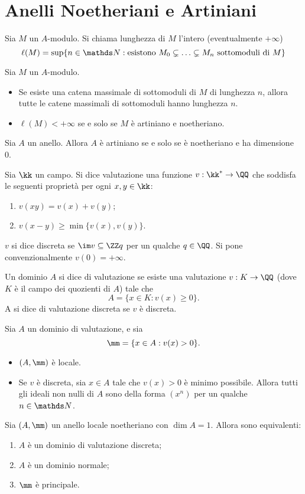 \section{Anelli Noetheriani e Artiniani}

\begin{definition}
Sia $M$ un $A$-modulo. Si chiama lunghezza di $M$ l'intero (eventualmente $+\infty$)
$$
\ell(M)=\sup\{n\in\NN:\text{esistono $M_0\subsn\ldots\subsn M_n$ sottomoduli di $M$}\}
$$
\end{definition}
\begin{lemma}
Sia $M$ un $A$-modulo.
\begin{itemize}
\item Se esiste una catena massimale di sottomoduli di $M$ di lunghezza $n$, allora tutte le catene massimali di sottomoduli hanno lunghezza $n$.
\item $\ell(M)<+\infty$ se e solo se $M$ è artiniano e noetheriano.
\end{itemize}
\end{lemma}
\begin{proposition}
Sia $A$ un anello. Allora $A$ è artiniano se e solo se è noetheriano e ha dimensione 0.
\end{proposition}
\begin{definition}
Sia $\kk$ un campo. Si dice valutazione una funzione $\map{v}{\kk^*}{\QQ}$ che soddisfa le seguenti proprietà per ogni $x,y\in\kk$:
\begin{enumerate}
\item $v(xy)=v(x)+v(y)$;
\item $v(x-y)\ge\min\{v(x),v(y)\}$.
\end{enumerate}
$v$ si dice discreta se $\im v\subs\ZZ q$ per un qualche $q\in\QQ$. Si pone convenzionalmente $v(0)=+\infty$.
\end{definition}
\begin{definition}
Un dominio $A$ si dice di valutazione se esiste una valutazione $\map{v}{K}{\QQ}$ (dove $K$ è il campo dei quozienti di $A$) tale che 
$$
A=\{x\in K:v(x)\ge0\}.
$$
A si dice di valutazione discreta se $v$ è discreta.
\end{definition}
\begin{proposition}
Sia $A$ un dominio di valutazione, e sia
$$
\mm=\{x\in A:v(x)>0\}.
$$
\begin{itemize}
\item $(A,\mm)$ è locale.
\item Se $v$ è discreta, sia $x\in A$ tale che $v(x)>0$ è minimo possibile. Allora tutti gli ideali non nulli di $A$ sono della forma $(x^n)$ per un qualche $n\in\NN$.
\end{itemize}
\end{proposition}
\begin{proposition}
Sia $(A,\mm)$ un anello locale noetheriano con $\dim A=1$. Allora sono equivalenti:
\begin{enumerate}
\item $A$ è un dominio di valutazione discreta;
\item $A$ è un dominio normale;
\item $\mm$ è principale.
\end{enumerate}
\end{proposition}